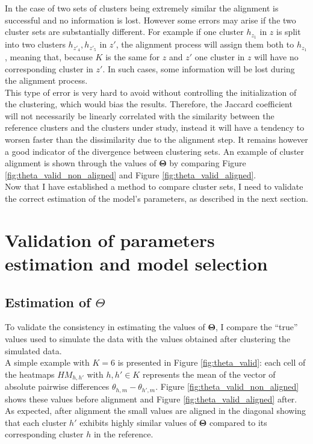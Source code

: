 In the case of two sets of clusters being extremely similar the alignment is successful and no information is lost. However some errors may arise if the two cluster sets are substantially different. For example if one cluster $h_{z_1}$ in $z$ is split into two clusters $h_{z'_4},h_{z'_5}$ in $z'$, the alignment process will assign them both to $h_{z_1}$, meaning that, because $K$ is the same for $z$ and $z'$ one cluster in $z$ will have no corresponding cluster in $z'$. In such cases, some information will be lost during the alignment process.\\

This type of error is very hard to avoid without controlling the initialization of the clustering, which would bias the results. Therefore, the Jaccard coefficient will not necessarily be linearly correlated with the similarity between the reference clusters and the clusters under study, instead it will have a tendency to worsen faster than the dissimilarity due to the alignment step. It remains however a good indicator of the divergence between clustering sets. An example of cluster alignment is shown through the values of $\boldsymbol{\Theta}$ by comparing  Figure \ref{fig:theta_valid_non_aligned} and Figure \ref{fig:theta_valid_aligned}.\\

Now that I have established a method to compare cluster sets, I need to validate the correct estimation of the model's parameters, as described in the next section.


\section{Validation of parameters estimation and model selection}
	\subsection{Estimation of $\Theta$}
	To validate the consistency in estimating the values of $\boldsymbol{\Theta}$, I compare the ``true'' values used to simulate the data with the values obtained after clustering the simulated data.\\
	
	A simple example with $K=6$ is presented in Figure \ref{fig:theta_valid}: each cell of the heatmaps $HM_{h,h'}$ with $h,h' \in K$ represents the mean of the vector of absolute pairwise differences $\theta_{h,m} - \theta_{h',m}$. Figure \ref{fig:theta_valid_non_aligned} shows these values before alignment and Figure \ref{fig:theta_valid_aligned} after. As expected, after alignment the small values are aligned in the diagonal showing that each cluster $h'$ exhibits highly similar values of $\boldsymbol{\Theta}$ compared to its corresponding cluster $h$ in the reference.\\
	 
